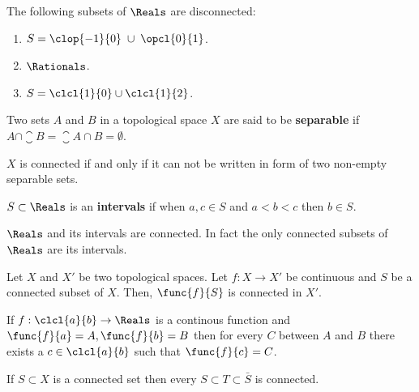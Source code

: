 \begin{definition}
    
\end{definition}
\begin{example}
    The following subsets of \(\Reals\) are disconnected:
    \begin{enumerate}
        \item \(S =\clop{-1}{0} \;\cup\; \opcl{0}{1}\).
        \item \(\Rationals\).
        \item \(S = \clcl{1}{0} \cup \clcl{1}{2}\).
    \end{enumerate}
\end{example}

\begin{definition}
    Two sets \(A\) and \(B\) in a topological space \(X\) are said to be \textbf{separable} if \(A \cap \closure B = \closure A \cap B = \emptyset\).
\end{definition}

\begin{proposition}
    \(X\) is connected if and only if it can not be written in form of two non-empty separable sets.
\end{proposition}

\begin{definition}
    \(S \subset \Reals\) is an \textbf{intervals} if when \(a , c \in S\) and \(a < b < c\) then \(b \in S\).
\end{definition}
\begin{example}
    \(\Reals\) and its intervals are connected. In fact the only connected subsets of \(\Reals\) are its intervals.
\end{example}
\begin{theorem}
    Let \(X\) and \(X'\) be two topological spaces. Let \(f : X \to X'\) be continuous and \(S\) be a connected subset of \(X\). Then, \(\func{f}{S}\) is connected in \(X'\).
\end{theorem}

\begin{corollary} 
    If \(f : \clcl{a}{b} \to \Reals\) is a continous function and \(\func{f}{a} = A, \func{f}{b} = B\) then for every \(C\) between \(A\) and \(B\) there exists a \(c \in \clcl{a}{b}\) such that \(\func{f}{c} = C\).
\end{corollary}
\begin{proposition}
    If \(S \subset X\) is a connected set then every \(S \subset T \subset \bar{S}\) is connected.
\end{proposition}

